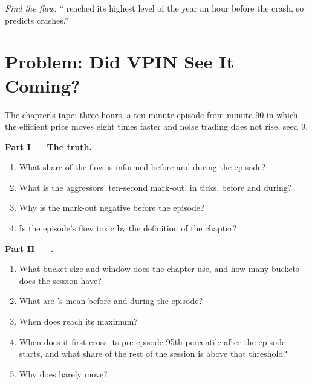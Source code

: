 \begin{exercise}[$\star\star\star$]\label{exo:rs:trade-flow-features:8}
\emph{Find the flaw.} `` reached its highest level of the year an hour before the crash, so  predicts crashes.''
\end{exercise}

\section{Problem: Did VPIN See It Coming?}

\begin{problem}\label{pb:rs:trade-flow-features:1}
The chapter's tape: three hours, a ten-minute episode from minute 90 in which the efficient price moves eight times faster and noise
trading does not rise, seed 9.

\medskip\noindent\textbf{Part I --- The truth.}
\begin{enumerate}
\item What share of the flow is informed before and during the episode?
\item What is the aggressors' ten-second mark-out, in ticks, before and during?
\item Why is the mark-out negative before the episode?
\item Is the episode's flow toxic by the definition of the chapter?
\end{enumerate}

\medskip\noindent\textbf{Part II --- .}
\begin{enumerate}[resume]
\item What bucket size and window does the chapter use, and how many buckets does the session have?
\item What are 's mean before and during the episode?
\item When does  reach its maximum?
\item When does it first cross its pre-episode 95th percentile after the episode starts, and what share of the rest of the session is above
that threshold?
\item Why does  barely move?
\end{enumerate}


\end{problem}
